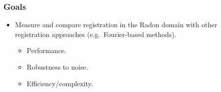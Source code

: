 \documentclass[12pt,x11names]{beamer}
\begin{document}
\begin{frame}
  \frametitle{Goals}
  
  \begin{itemize}
  \item Measure and compare registration in the Radon domain with other
    registration approaches (e.g.\ Fourier-based methods).
    \begin{itemize}
    \item Performance.
    \item Robustness to noise.
    \item Efficiency/complexity.
    \end{itemize}
  \end{itemize}
\end{frame}

\nocite{*}




\end{document}
